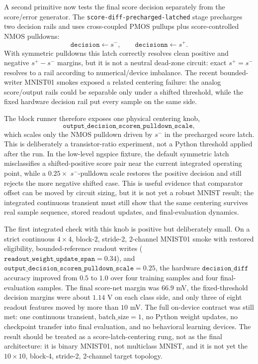 \documentclass[11pt]{article}
\newcommand{\code}[1]{\texttt{#1}}
\begin{document}
A second primitive now tests the final score decision separately from the
score/error generator.  The \code{score-diff-precharged-latched} stage
precharges two decision rails and uses cross-coupled PMOS pullups plus
score-controlled NMOS pulldowns:
\[
  \code{decision}\leftarrow s^-,
  \qquad
  \code{decisionn}\leftarrow s^+ .
\]
With symmetric pulldowns this latch correctly resolves clean positive and
negative \(s^+-s^-\) margins, but it is not a neutral dead-zone circuit: exact
\(s^+=s^-\) resolves to a rail according to numerical/device imbalance.  The
recent bounded-writer MNIST01 smokes exposed a related centering failure: the
analog score/output rails could be separable only under a shifted threshold,
while the fixed hardware decision rail put every sample on the same side.

The block runner therefore exposes one physical centering knob,
\[
  \code{output\_decision\_scoren\_pulldown\_scale},
\]
which scales only the NMOS pulldown driven by \(s^-\) in the precharged score
latch.  This is deliberately a transistor-ratio experiment, not a Python
threshold applied after the run.  In the low-level ngspice fixture, the default
symmetric latch misclassifies a shifted-positive score pair near the current
integrated operating point, while a \(0.25\times\) \(s^-\)-pulldown scale
restores the positive decision and still rejects the more negative shifted
case.  This is useful evidence that comparator offset can be moved by circuit
sizing, but it is not yet a robust MNIST result; the integrated continuous
transient must still show that the same centering survives real sample
sequence, stored readout updates, and final-evaluation dynamics.

The first integrated check with this knob is positive but deliberately small.
On a strict continuous \(4\times4\), block-2, stride-2, 2-channel MNIST01
smoke with restored eligibility, bounded-reference readout writes
(\(\code{readout\_weight\_update\_span}=0.34\)), and
\(\code{output\_decision\_scoren\_pulldown\_scale}=0.25\), the hardware
\(\code{decision\_diff}\) accuracy improved from \(0.5\) to \(1.0\) over four
training samples and four final-evaluation samples.  The final score-net
margin was \(66.9\) mV, the fixed-threshold decision margins were about
\(1.14\) V on each class side, and only three of eight readout features moved
by more than \(10\) mV.  The full on-device contract was still met: one
continuous transient, \(\mathrm{batch\_size}=1\), no Python weight updates,
no checkpoint transfer into final evaluation, and no behavioral learning
devices.  The result should be treated as a score-latch-centering rung, not as
the final architecture: it is binary MNIST01, not multiclass MNIST, and it is
not yet the \(10\times10\), block-4, stride-2, 2-channel target topology.
\end{document}
